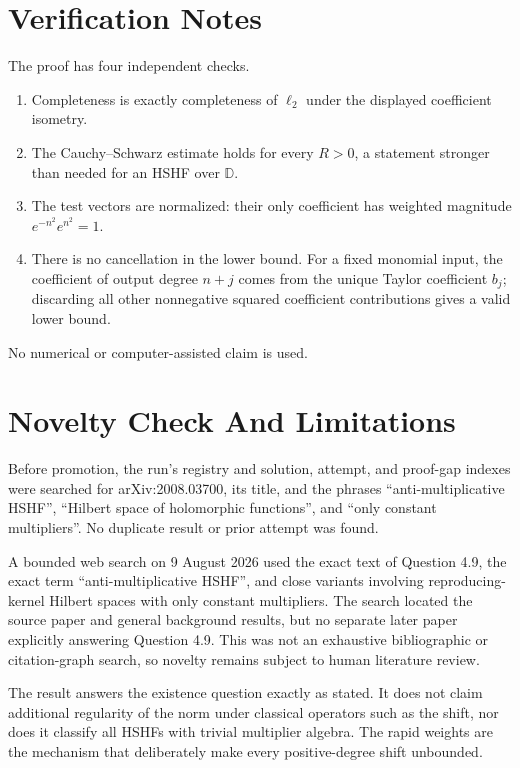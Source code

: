 \documentclass[11pt]{article}
\theoremstyle{definition}
\theoremstyle{remark}
\newcommand{\D}{\mathbb D}
\begin{document}
\section*{Verification Notes}

The proof has four independent checks.
\begin{enumerate}
  \item Completeness is exactly completeness of $\ell_2$ under the displayed
        coefficient isometry.
  \item The Cauchy--Schwarz estimate holds for every $R>0$, a statement
        stronger than needed for an HSHF over $\D$.
  \item The test vectors are normalized: their only coefficient has weighted
        magnitude $e^{-n^2}e^{n^2}=1$.
  \item There is no cancellation in the lower bound.  For a fixed monomial
        input, the coefficient of output degree $n+j$ comes from the unique
        Taylor coefficient $b_j$; discarding all other nonnegative squared
        coefficient contributions gives a valid lower bound.
\end{enumerate}
No numerical or computer-assisted claim is used.

\section*{Novelty Check And Limitations}

Before promotion, the run's registry and solution, attempt, and proof-gap
indexes were searched for arXiv:2008.03700, its title, and the phrases
``anti-multiplicative HSHF'', ``Hilbert space of holomorphic functions'', and
``only constant multipliers''.  No duplicate result or prior attempt was
found.

A bounded web search on 9 August 2026 used the exact text of Question 4.9,
the exact term ``anti-multiplicative HSHF'', and close variants involving
reproducing-kernel Hilbert spaces with only constant multipliers.  The search
located the source paper and general background results, but no separate later
paper explicitly answering Question 4.9.  This was not an exhaustive
bibliographic or citation-graph search, so novelty remains subject to human
literature review.

The result answers the existence question exactly as stated.  It does not
claim additional regularity of the norm under classical operators such as the
shift, nor does it classify all HSHFs with trivial multiplier algebra.  The
rapid weights are the mechanism that deliberately make every positive-degree
shift unbounded.
\end{document}
